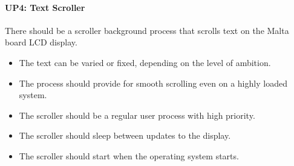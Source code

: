 \paragraph{UP4: Text Scroller}

There should be a scroller background process that scrolls text on the Malta board LCD display.

\begin{itemize}
  \item The text can be varied or fixed, depending on the level of ambition.
  \item  The process should provide for smooth scrolling even on a highly loaded system.
  \item  The scroller should be a regular user process with high priority.
  \item  The scroller should sleep between updates to the display.
  \item  The scroller should start when the operating system starts.
\end{itemize}
